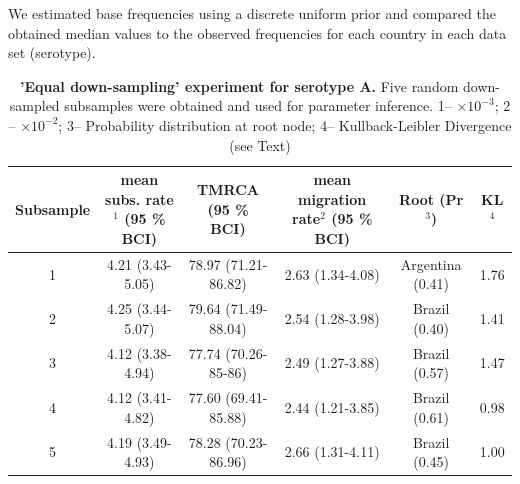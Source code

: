 \documentclass[a4paper,10pt]{article}
\begin{document}
We estimated base frequencies using a discrete uniform prior and compared the obtained median values to the observed frequencies for each country in each data set (serotype). 
\newpage
\begin{table}
\medskip
\begin{minipage}{\textwidth} 
\begin{center}
\caption{ {{\bf 'Equal down-sampling' experiment for serotype A.}} 
Five random down-sampled subsamples were obtained and used for parameter inference.
1-- $\times 10^{-3}$; 2 -- $\times 10^{-2}$; 3-- Probability distribution at root node; 4-- Kullback-Leibler Divergence (see Text) }
\begin{tabular}{cccccc}
\toprule
Subsample	&mean subs. rate$^{1}$ (95 \% BCI)	&TMRCA (95 \% BCI)	&mean migration rate$^{2}$  (95 \% BCI)	&Root (Pr$^{3}$)& KL$^4$\\
\midrule
1	&4.21 (3.43-5.05)	&78.97 (71.21-86.82)	&2.63 (1.34-4.08)	&Argentina (0.41)& 1.76\\
2	&4.25 (3.44-5.07)	&79.64 (71.49-88.04)	&2.54 (1.28-3.98)	&Brazil (0.40)& 1.41\\
3	&4.12 (3.38-4.94)	&77.74 (70.26-85-86)	&2.49 (1.27-3.88)	&Brazil (0.57)&1.47\\
4	&4.12 (3.41-4.82)	&77.60 (69.41-85.88)	&2.44 (1.21-3.85)	&Brazil (0.61)&0.98\\
5	&4.19 (3.49-4.93)	&78.28 (70.23-86.96)	&2.66 (1.31-4.11)	&Brazil (0.45)& 1.00\\
\bottomrule
\end{tabular}
\label{stab:ED_A}
\end{center}
\end{minipage}
\end{table}
\end{document}

